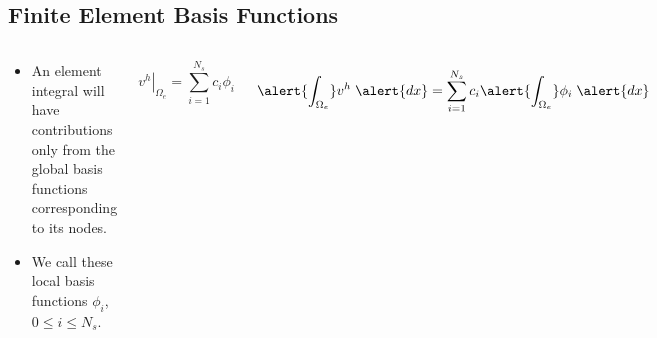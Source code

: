 \subsection*{Finite Element Basis Functions}
\begin{frame}
    \begin{columns}[t]
    \begin{block}{}


	\begin{itemize}
	  \item{An element integral will have contributions only
	    from the global basis functions corresponding to its nodes.}
	  \item{We call these local basis functions $\phi_i$, $0 \leq i \leq N_s$.}
	\end{itemize}
    \end{block}

	    \begin{equation}
	      \nonumber
	      \left. v^h \right|_{\Omega_e} = \sum_{i=1}^{N_s} c_i \phi_i
	    \end{equation}
      {
	    \begin{equation}
	      \nonumber
	      \alert{\int_{\Omega_e}} v^h \;\alert{dx}
	      = \sum_{i=1}^{N_s} c_i \alert{\int_{\Omega_e}}\phi_i \;\alert{dx}
	    \end{equation}

}
\end{columns}
\end{frame}
